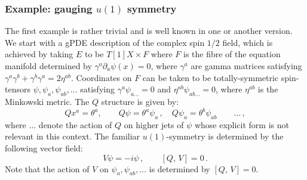 \documentclass[a4paper,12pt]{article}
\numberwithin{equation}{section} %
\renewcommand{\d}{\partial}
\newcommand{\commut}[2]{[#1{,}\,#2]}
\begin{document}
\subsubsection{Example: gauging $u(1)$ symmetry}\label{sec:dirac}
The first example is rather trivial and is well known in one or another version. We start with a gPDE description of the complex spin $1/2$ field, which is  achieved by taking $E$ to be $T[1]X \times F$ where $F$ is the fibre of the equation manifold determined by $\gamma^a \d_a\psi(x)=0$, where $\gamma^a$ are gamma matrices satisfying $\gamma^a\gamma^b+\gamma^b\gamma^a=2\eta^{ab}$. Coordinates on $F$ can be taken to be totally-symmetric spin-tensors $\psi, \psi_a,\psi_{ab},\ldots$ satisfying $\gamma^a\psi_{a\ldots}=0$ and $\eta^{ab}\psi_{ab\ldots}=0$, where $\eta^{ab}$ is the Minkowski metric. The $Q$ structure is given by:
\begin{equation}
Qx^a=\theta^a, \qquad Q\psi=\theta^a\psi_a\,, \quad Q\psi_a = \theta^b\psi_{ab}%
\qquad \ldots \,,
\end{equation}
where $\ldots$ denote the action of $Q$ on higher jets of $\psi$ whose explicit form is not relevant in this context. The familiar $u(1)$-symmetry is determined by the following vector field:
\begin{equation}
V\psi= -i\psi\,, \qquad \commut{Q}{V}=0\,.
\end{equation}
Note that the action of $V$ on $\psi_a,\psi_{ab},\ldots $ is determined by $\commut{Q}{V}=0$. 
\end{document}

